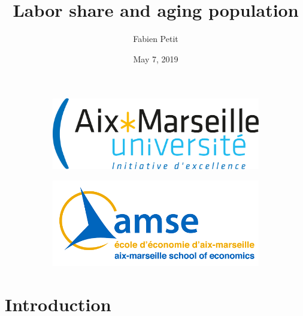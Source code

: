 \documentclass{beamer}
\begin{document}
	\title[Labor share \& aging population]{Labor share and aging population}
	\author{Fabien Petit}
	\date{May 7, 2019}
	
	\begin{frame}
		\titlepage
		\vspace{-0.5cm}
		\begin{figure}
			\begin{subfigure}[h]{0.49\linewidth}
				\centering
				\includegraphics[width=0.7\linewidth]{Pictures/amu} 
			\end{subfigure}
			\begin{subfigure}[h]{0.49\linewidth}
				\centering
				\includegraphics[width=0.7\linewidth]{Pictures/amse.png}
			\end{subfigure}
		\end{figure}
	\end{frame}

	\section{Introduction}
\end{document}
